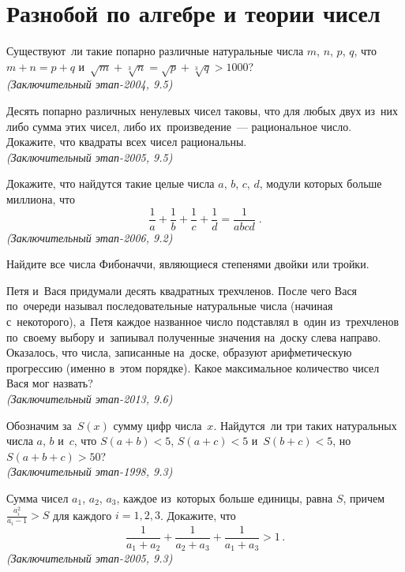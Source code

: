 
\section*{Разнобой по алгебре и теории чисел}


\begin{problems}

\item
Существуют~ли такие попарно различные натуральные числа $m$, $n$, $p$, $q$, что
$m + n = p + q$ и~$\sqrt{m} + \sqrt[3]{n} = \sqrt{p} + \sqrt[3]{q} > 1000$?
\\\emph{(Заключительный этап-2004, 9.5)}

\item
Десять попарно различных ненулевых чисел таковы, что для любых двух из~них либо
сумма этих чисел, либо их~произведение~--- рациональное число.
Докажите, что квадраты всех чисел рациональны.
\\\emph{(Заключительный этап-2005, 9.5)}

\item
Докажите, что найдутся такие целые числа $a$, $b$, $c$, $d$, модули которых
больше миллиона, что
\[
    \frac{1}{a} + \frac{1}{b} + \frac{1}{c} + \frac{1}{d}
=
    \frac{1}{a b c d}
\;.\]
\emph{(Заключительный этап-2006, 9.2)}

\item
Найдите все числа Фибоначчи, являющиеся степенями двойки или тройки.

\item
Петя и~Вася придумали десять квадратных трехчленов.
После чего Вася по~очереди называл последовательные натуральные числа
(начиная с~некоторого), а~Петя каждое названное число подставлял в~один
из~трехчленов по~своему выбору и~запиывал полученные значения на~доску слева
направо.
Оказалось, что числа, записанные на~доске, образуют арифметическую прогрессию
(именно в~этом порядке).
Какое максимальное количество чисел Вася мог назвать?
\\\emph{(Заключительный этап-2013, 9.6)}

\item
Обозначим за~$S(x)$ сумму цифр числа~$x$.
Найдутся~ли три таких натуральных числа $a$, $b$ и~$c$, что
$S(a + b) < 5$, $S(a + c) < 5$ и~$S(b + c) < 5$, но~$S(a + b + c) > 50$?
\\\emph{(Заключительный этап-1998, 9.3)}

\item
Сумма чисел $a_1$, $a_2$, $a_3$, каждое из~которых больше единицы, равна $S$,
причем $\frac{a_i^2}{a_i - 1} > S$ для каждого $i = 1, 2, 3$.
Докажите, что
\[
    \frac{1}{a_1 + a_2} + \frac{1}{a_2 + a_3} + \frac{1}{a_1 + a_3}
>
    1
\,.\]
\emph{(Заключительный этап-2005, 9.3)}

\end{problems}

